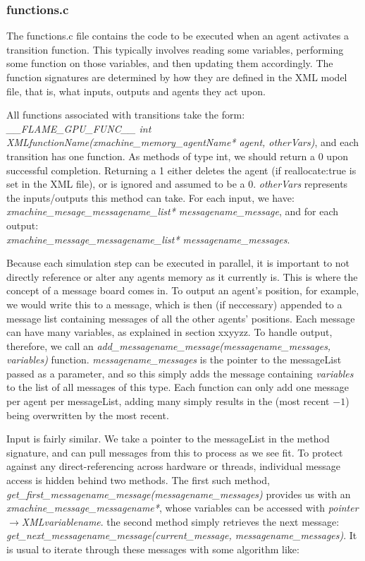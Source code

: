\documentclass[11pt,a4paper]{article}
\begin{document}
\subsubsection{functions.c}

The functions.c file contains the code to be executed when an agent activates a transition function. This typically involves reading some variables, performing some function on those variables, and then updating them accordingly. The function signatures are determined by how they are defined in the XML model file, that is, what inputs, outputs and agents they act upon.

All functions associated with transitions take the form: \\\emph{\_\_FLAME\_GPU\_FUNC\_\_ int XMLfunctionName(xmachine\_memory\_agentName* agent, otherVars)}, and each transition has one function. As methods of type int, we should return a 0 upon successful completion. Returning a 1 either deletes the agent (if reallocate:true is set in the XML file), or is ignored and assumed to be a 0. \emph{otherVars} represents the inputs/outputs this method can take. For each input, we have: \emph{xmachine\_mesage\_messagename\_list* messagename\_message}, and for each output:\\ \emph{xmachine\_message\_messagename\_list* messagename\_messages}. 

Because each simulation step can be executed in parallel, it is important to not directly reference or alter any agents memory as it currently is. This is where the concept of a message board comes in. To output an agent's position, for example, we would write this to a message, which is then (if neccessary) appended to a message list containing messages of all the other agents' positions. Each message can have many variables, as explained in section xxyyzz. To handle output, therefore, we call an \emph{add\_messagename\_message(messagename\_messages, variables)} function. \emph{messagename\_messages} is the pointer to the messageList passed as a parameter, and so this simply adds the message containing \emph{variables} to the list of all messages of this type. Each function can only add one message per agent per messageList, adding many simply results in the (most recent $-1$) being overwritten by the most recent.

Input is fairly similar. We take a pointer to the messageList in the method signature, and can pull messages from this to process as we see fit. To protect against any direct-referencing across hardware or threads, individual message access is hidden behind two methods. The first such method, \emph{get\_first\_messagename\_message(messagename\_messages)} provides us with an\\ \emph{xmachine\_message\_messagename*}, whose variables can be accessed with \emph{pointer$\to$XMLvariablename}. the second method simply retrieves the next message:\\ \emph{get\_next\_messagename\_message(current\_message, messagename\_messages)}. It is usual to iterate through these messages with some algorithm like:
\end{document}
